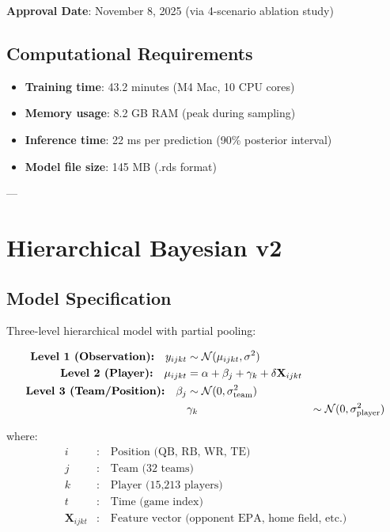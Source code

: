 \textbf{Approval Date}: November 8, 2025 (via 4-scenario ablation study)

\subsection{Computational Requirements}

\begin{itemize}
\item \textbf{Training time}: 43.2 minutes (M4 Mac, 10 CPU cores)
\item \textbf{Memory usage}: 8.2 GB RAM (peak during sampling)
\item \textbf{Inference time}: 22 ms per prediction (90\% posterior interval)
\item \textbf{Model file size}: 145 MB (.rds format)
\end{itemize}

---

\section{Hierarchical Bayesian v2}

\subsection{Model Specification}

Three-level hierarchical model with partial pooling:

\begin{align}
\text{\textbf{Level 1 (Observation):}} \quad y_{ijkt} &\sim \mathcal{N}(\mu_{ijkt}, \sigma^2) \\
\text{\textbf{Level 2 (Player):}} \quad \mu_{ijkt} &= \alpha + \beta_j + \gamma_k + \delta \mathbf{X}_{ijkt} \\
\text{\textbf{Level 3 (Team/Position):}} \quad \beta_j &\sim \mathcal{N}(0, \sigma^2_{\text{team}}) \\
                                             & \gamma_k &\sim \mathcal{N}(0, \sigma^2_{\text{player}})
\label{eq:hierarchical-spec}
\end{align}

where:
\begin{align}
i &: \quad \text{Position (QB, RB, WR, TE)} \\
j &: \quad \text{Team (32 teams)} \\
k &: \quad \text{Player (15,213 players)} \\
t &: \quad \text{Time (game index)} \\
\mathbf{X}_{ijkt} &: \quad \text{Feature vector (opponent EPA, home field, etc.)}
\end{align}

